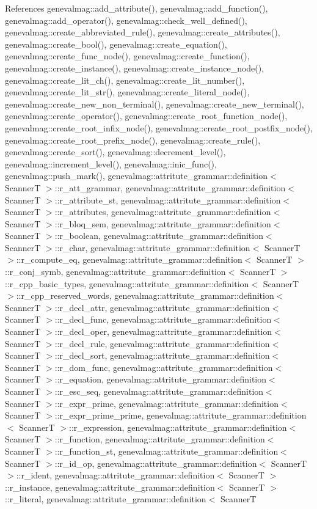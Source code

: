 References genevalmag::add\_\-attribute(), genevalmag::add\_\-function(), genevalmag::add\_\-operator(), genevalmag::check\_\-well\_\-defined(), genevalmag::create\_\-abbreviated\_\-rule(), genevalmag::create\_\-attributes(), genevalmag::create\_\-bool(), genevalmag::create\_\-equation(), genevalmag::create\_\-func\_\-node(), genevalmag::create\_\-function(), genevalmag::create\_\-instance(), genevalmag::create\_\-instance\_\-node(), genevalmag::create\_\-lit\_\-ch(), genevalmag::create\_\-lit\_\-number(), genevalmag::create\_\-lit\_\-str(), genevalmag::create\_\-literal\_\-node(), genevalmag::create\_\-new\_\-non\_\-terminal(), genevalmag::create\_\-new\_\-terminal(), genevalmag::create\_\-operator(), genevalmag::create\_\-root\_\-function\_\-node(), genevalmag::create\_\-root\_\-infix\_\-node(), genevalmag::create\_\-root\_\-postfix\_\-node(), genevalmag::create\_\-root\_\-prefix\_\-node(), genevalmag::create\_\-rule(), genevalmag::create\_\-sort(), genevalmag::decrement\_\-level(), genevalmag::increment\_\-level(), genevalmag::inic\_\-func(), genevalmag::push\_\-mark(), genevalmag::attritute\_\-grammar::definition$<$ ScannerT $>$::r\_\-att\_\-grammar, genevalmag::attritute\_\-grammar::definition$<$ ScannerT $>$::r\_\-attribute\_\-st, genevalmag::attritute\_\-grammar::definition$<$ ScannerT $>$::r\_\-attributes, genevalmag::attritute\_\-grammar::definition$<$ ScannerT $>$::r\_\-bloq\_\-sem, genevalmag::attritute\_\-grammar::definition$<$ ScannerT $>$::r\_\-boolean, genevalmag::attritute\_\-grammar::definition$<$ ScannerT $>$::r\_\-char, genevalmag::attritute\_\-grammar::definition$<$ ScannerT $>$::r\_\-compute\_\-eq, genevalmag::attritute\_\-grammar::definition$<$ ScannerT $>$::r\_\-conj\_\-symb, genevalmag::attritute\_\-grammar::definition$<$ ScannerT $>$::r\_\-cpp\_\-basic\_\-types, genevalmag::attritute\_\-grammar::definition$<$ ScannerT $>$::r\_\-cpp\_\-reserved\_\-words, genevalmag::attritute\_\-grammar::definition$<$ ScannerT $>$::r\_\-decl\_\-attr, genevalmag::attritute\_\-grammar::definition$<$ ScannerT $>$::r\_\-decl\_\-func, genevalmag::attritute\_\-grammar::definition$<$ ScannerT $>$::r\_\-decl\_\-oper, genevalmag::attritute\_\-grammar::definition$<$ ScannerT $>$::r\_\-decl\_\-rule, genevalmag::attritute\_\-grammar::definition$<$ ScannerT $>$::r\_\-decl\_\-sort, genevalmag::attritute\_\-grammar::definition$<$ ScannerT $>$::r\_\-dom\_\-func, genevalmag::attritute\_\-grammar::definition$<$ ScannerT $>$::r\_\-equation, genevalmag::attritute\_\-grammar::definition$<$ ScannerT $>$::r\_\-esc\_\-seq, genevalmag::attritute\_\-grammar::definition$<$ ScannerT $>$::r\_\-expr\_\-prime, genevalmag::attritute\_\-grammar::definition$<$ ScannerT $>$::r\_\-expr\_\-prime\_\-prime, genevalmag::attritute\_\-grammar::definition$<$ ScannerT $>$::r\_\-expression, genevalmag::attritute\_\-grammar::definition$<$ ScannerT $>$::r\_\-function, genevalmag::attritute\_\-grammar::definition$<$ ScannerT $>$::r\_\-function\_\-st, genevalmag::attritute\_\-grammar::definition$<$ ScannerT $>$::r\_\-id\_\-op, genevalmag::attritute\_\-grammar::definition$<$ ScannerT $>$::r\_\-ident, genevalmag::attritute\_\-grammar::definition$<$ ScannerT $>$::r\_\-instance, genevalmag::attritute\_\-grammar::definition$<$ ScannerT $>$::r\_\-literal, genevalmag::attritute\_\-grammar::definition$<$ ScannerT 